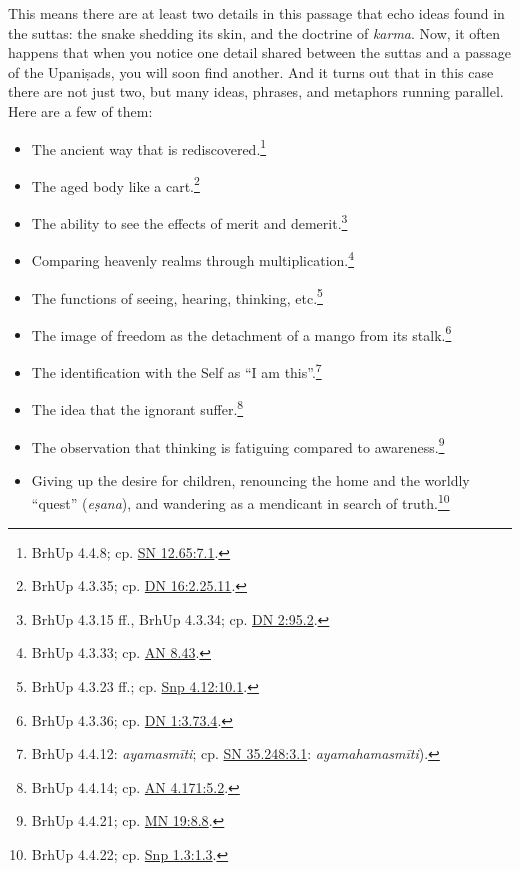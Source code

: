 \documentclass[12pt,openany]{book}%
\begin{document}
This means there are at least two details in this passage that echo ideas found in the suttas: the snake shedding its skin, and the doctrine of \textit{karma}. Now, it often happens that when you notice one detail shared between the suttas and a passage of the \textsanskrit{Upaniṣads}, you will soon find another. And it turns out that in this case there are not just two, but many ideas, phrases, and metaphors running parallel. Here are a few of them:

\begin{itemize}%
\item The ancient way that is rediscovered.\footnote{BrhUp 4.4.8; cp. \href{https://suttacentral.net/sn12.65/en/sujato\#7.1}{SN 12.65:7.1}. }%
\item The aged body like a cart.\footnote{BrhUp 4.3.35; cp. \href{https://suttacentral.net/dn16/en/sujato\#2.25.11}{DN 16:2.25.11}. }%
\item The ability to see the effects of merit and demerit.\footnote{BrhUp 4.3.15 ff., BrhUp 4.3.34; cp. \href{https://suttacentral.net/dn2/en/sujato\#95.2}{DN 2:95.2}. }%
\item Comparing heavenly realms through multiplication.\footnote{BrhUp 4.3.33; cp. \href{https://suttacentral.net/an8.43/en/sujato}{AN 8.43}. }%
\item The functions of seeing, hearing, thinking, etc.\footnote{BrhUp 4.3.23 ff.; cp. \href{https://suttacentral.net/snp4.12/en/sujato\#10.1}{Snp 4.12:10.1}. }%
\item The image of freedom as the detachment of a mango from its stalk.\footnote{BrhUp 4.3.36; cp. \href{https://suttacentral.net/dn1/en/sujato\#3.73.4}{DN 1:3.73.4}. }%
\item The identification with the Self as “I am this”.\footnote{BrhUp 4.4.12: \textit{\textsanskrit{ayamasmīti}}; cp. \href{https://suttacentral.net/sn35.248/en/sujato\#3.1}{SN 35.248:3.1}: \textit{\textsanskrit{ayamahamasmīti}}). }%
\item The idea that the ignorant suffer.\footnote{BrhUp 4.4.14; cp. \href{https://suttacentral.net/an4.171/en/sujato\#5.2}{AN 4.171:5.2}. }%
\item The observation that thinking is fatiguing compared to awareness.\footnote{BrhUp 4.4.21; cp. \href{https://suttacentral.net/mn19/en/sujato\#8.8}{MN 19:8.8}. }%
\item Giving up the desire for children, renouncing the home and the worldly “quest” (\textit{\textsanskrit{eṣana}}), and wandering as a mendicant in search of truth.\footnote{BrhUp 4.4.22; cp. \href{https://suttacentral.net/snp1.3/en/sujato\#1.3}{Snp 1.3:1.3}. }%

\end{itemize}
\end{document}
